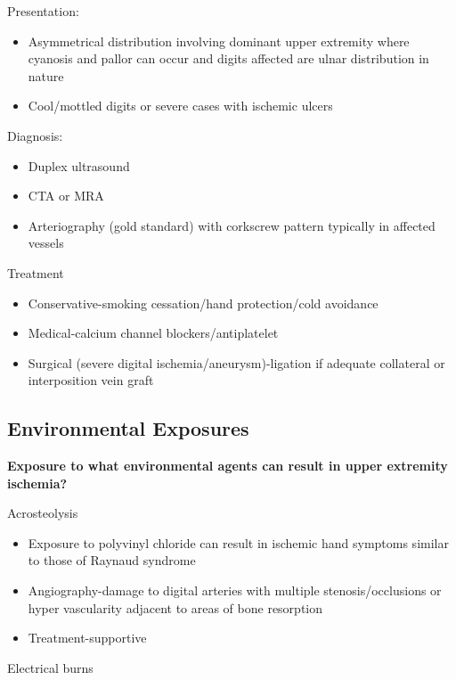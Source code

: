 \documentclass[
]{book}
\begin{document}
Presentation:~

\begin{itemize}
\item
  Asymmetrical distribution involving dominant upper extremity where
  cyanosis and pallor can occur and digits affected are ulnar
  distribution in nature~
\item
  Cool/mottled digits or severe cases with ischemic ulcers
\end{itemize}

Diagnosis:~

\begin{itemize}
\item
  Duplex ultrasound~
\item
  CTA or MRA~
\item
  Arteriography (gold standard) with corkscrew pattern typically in
  affected vessels
\end{itemize}

Treatment~

\begin{itemize}
\item
  Conservative-smoking cessation/hand protection/cold avoidance~
\item
  Medical-calcium channel blockers/antiplatelet
\item
  Surgical (severe digital ischemia/aneurysm)-ligation if adequate
  collateral or interposition vein graft
\end{itemize}

\hypertarget{environmental-exposures}{%
\subsection{Environmental Exposures}\label{environmental-exposures}}

\textbf{Exposure to what environmental agents can result in upper extremity
ischemia?}

Acrosteolysis

\begin{itemize}
\item
  Exposure to polyvinyl chloride can result in ischemic hand symptoms
  similar to those of Raynaud syndrome~
\item
  Angiography-damage to digital arteries with multiple
  stenosis/occlusions or hyper vascularity adjacent to areas of bone
  resorption~
\item
  Treatment-supportive
\end{itemize}

Electrical burns
\end{document}
